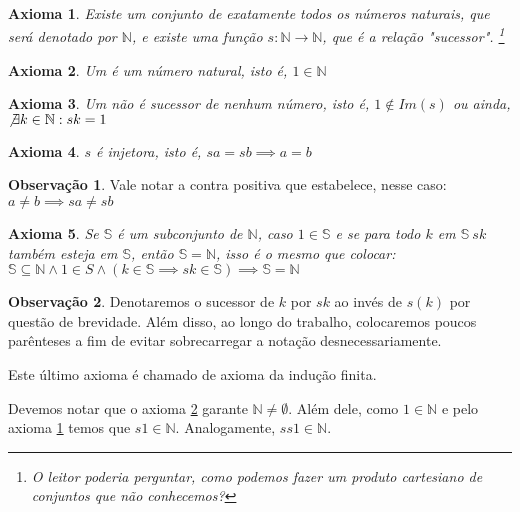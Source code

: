 \documentclass[
	12pt,				%
	oneside,			%
	a4paper,			%
	english,			%
	french,				%
	spanish,			%
	brazil,				%
	]{abntex2}
\newcommand{\N}{\ensuremath {\mathbb{N}} }
\renewcommand{\S}{\ensuremath {\mathbb{S}} }
\theoremstyle{plain}
\newtheorem{axi}{Axioma}
\theoremstyle{definition}
\newtheorem{obs}{Observação}[chapter]
\begin{document}
\begin{axi}\label{axi-existe-n-s}
    Existe um conjunto de exatamente todos os números naturais, que será denotado por $\N$, e existe uma função $s: \N \rightarrow \N$, que é a relação "sucessor". \footnote{O leitor poderia perguntar, como podemos fazer um produto cartesiano de conjuntos que não conhecemos?}
\end{axi} %
\begin{axi}\label{axi-um-natural}
    Um é um número natural, isto é, $1 \in \N$
\end{axi}
\begin{axi}\label{axi-um-nao-sucessor}
    Um não é sucessor de nenhum número, isto é, $1 \not \in Im(s)$ ou ainda, $\not \exists k \in \N : sk = 1$
\end{axi}
\begin{axi}\label{axi-s-injetora}
    $s$ é injetora, isto é, $sa = sb \implies a = b$
\end{axi}
\begin{obs}
    Vale notar a contra positiva que estabelece, nesse caso: $a \neq b \implies sa \neq sb$
\end{obs}
\begin{axi}\label{axi-ind-finita}
    Se $\S$ é um subconjunto de $\N$, caso $1 \in \S$ e se para todo $k$ em $\S\ sk$ também esteja em $\S$, então $\S = \N$, isso é o mesmo que colocar:
     $\S \subseteq \N \land 1 \in S \land ( k \in \S \implies sk \in \S) \implies \S = \N$
\end{axi}
\begin{obs}
    Denotaremos o sucessor de $k$ por $sk$ ao invés de $s(k)$ por questão de brevidade. Além disso, ao longo do trabalho, colocaremos poucos parênteses a fim de evitar sobrecarregar a notação desnecessariamente.
\end{obs}
Este último axioma é chamado de axioma da indução finita.

Devemos notar que o axioma \ref{axi-um-natural} garante $\N \neq \emptyset $. Além dele, como $1 \in \N$ e pelo axioma \ref{axi-existe-n-s} temos que $s1 \in \N$. Analogamente, $ss1 \in \N$.
\end{document}
